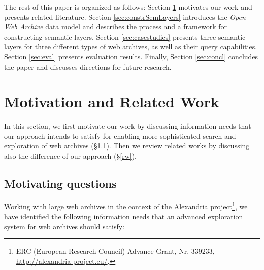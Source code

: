 \documentclass{libtex/sig-alternate-05-2015}
\begin{document}
\vspace{1mm}
The rest of this paper is organized as follows:
Section \ref{sec:motivAndRW} motivates our work and presents
related literature.
Section \ref{sec:constrSemLayers} introduces the
{\em Open Web Archive} data model and describes
the process and a framework for constructing semantic layers.
Section \ref{sec:casestudies} presents three semantic layers
for three different types of web archives, as well as
their query capabilities.
Section \ref{sec:eval} presents evaluation results.
Finally, Section \ref{sec:concl} concludes the paper and
discusses directions
for future research.


\section{Motivation and Related Work}
\label{sec:motivAndRW}

In this section, we first
motivate our work by discussing information needs that our approach intends to
satisfy for enabling more sophisticated search and exploration of web archives (\S \ref{motivation}).
Then we review related works by discussing also the difference of our approach (\S \ref{rw}).

\subsection{Motivating questions}
\label{motivation}

Working with large web archives in the context of the
Alexandria project\footnote{ERC (European Research Council)
Advance Grant, Nr. 339233, \url{http://alexandria-project.eu/}.},
we have identified the following information needs
that an advanced exploration system for web archives should satisfy:
\end{document}
